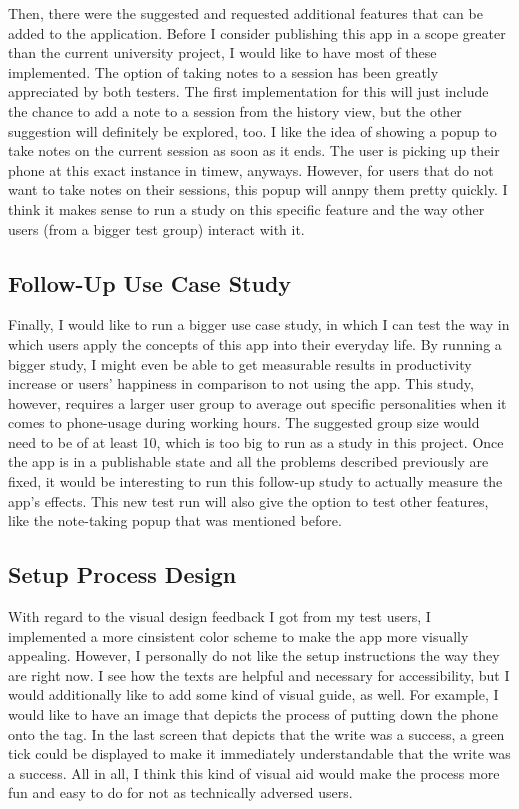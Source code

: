 \documentclass[conference]{IEEEtran}
\begin{document}
Then, there were the suggested and requested additional features that can be added to the application. Before I consider publishing this app in a scope greater than the current university project, I would like to have most of these implemented. The option of taking notes to a session has been greatly appreciated by both testers. The first implementation for this will just include the chance to add a note to a session from the history view, but the other suggestion will definitely be explored, too. I like the idea of showing a popup to take notes on the current session as soon as it ends. The user is picking up their phone at this exact instance in timew, anyways. However, for users that do not want to take notes on their sessions, this popup will annpy them pretty quickly. I think it makes sense to run a study on this specific feature and the way other users (from a bigger test group) interact with it.

\subsection{Follow-Up Use Case Study}
Finally, I would like to run a bigger use case study, in which I can test the way in which users apply the concepts of this app into their everyday life. By running a bigger study, I might even be able to get measurable results in productivity increase or users' happiness in comparison to not using the app. This study, however, requires a larger user group to average out specific personalities when it comes to phone-usage during working hours. The suggested group size would need to be of at least 10, which is too big to run as a study in this project. Once the app is in a publishable state and all the problems described previously are fixed, it would be interesting to run this follow-up study to actually measure the app's effects. This new test run will also give the option to test other features, like the note-taking popup that was mentioned before.

\subsection{Setup Process Design}
With regard to the visual design feedback I got from my test users, I implemented a more cinsistent color scheme to make the app more visually appealing. However, I personally do not like the setup instructions the way they are right now. I see how the texts are helpful and necessary for accessibility, but I would additionally like to add some kind of visual guide, as well. For example, I would like to have an image that depicts the process of putting down the phone onto the tag. In the last screen that depicts that the write was a success, a green tick could be displayed to make it immediately understandable that the write was a success. All in all, I think this kind of visual aid would make the process more fun and easy to do for not as technically adversed users.
\end{document}
